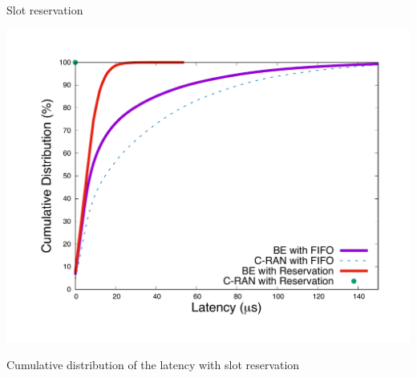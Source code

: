\documentclass[10 pt]{beamer}
\begin{document}
\begin{frame}{Slot reservation}

\centering
\includegraphics[scale=0.35]{optim}

 Cumulative distribution of the latency with slot reservation 

\end{frame}
\end{document}
